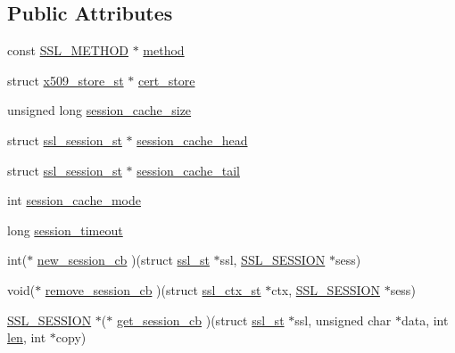 \subsection*{Public Attributes}
\begin{DoxyCompactItemize}
\item 
const \hyperlink{ssl_8h_a74d54b9a714accac31c73bfb55973e81}{S\+S\+L\+\_\+\+M\+E\+T\+H\+OD} $\ast$ \hyperlink{structssl__ctx__st_a9e4773d3ec5b1a80abab92390015c576}{method}
\item 
struct \hyperlink{structx509__store__st}{x509\+\_\+store\+\_\+st} $\ast$ \hyperlink{structssl__ctx__st_a8b6658b3bc3acb20908f2541056e3949}{cert\+\_\+store}
\item 
unsigned long \hyperlink{structssl__ctx__st_af715c6f8caa8c192423ad5abfa211e6e}{session\+\_\+cache\+\_\+size}
\item 
struct \hyperlink{structssl__session__st}{ssl\+\_\+session\+\_\+st} $\ast$ \hyperlink{structssl__ctx__st_a3683adb75792a407eee86f042a7c7c68}{session\+\_\+cache\+\_\+head}
\item 
struct \hyperlink{structssl__session__st}{ssl\+\_\+session\+\_\+st} $\ast$ \hyperlink{structssl__ctx__st_a1524f4319d24d011a575b8e9a70a0065}{session\+\_\+cache\+\_\+tail}
\item 
int \hyperlink{structssl__ctx__st_a957af083f0d87b4347e29788bd7e00e5}{session\+\_\+cache\+\_\+mode}
\item 
long \hyperlink{structssl__ctx__st_a7b165f0e9fbde0499dedb660cdf0d756}{session\+\_\+timeout}
\item 
int($\ast$ \hyperlink{structssl__ctx__st_a114da734a32555bec7ac1543e7fcef11}{new\+\_\+session\+\_\+cb} )(struct \hyperlink{structssl__st}{ssl\+\_\+st} $\ast$ssl, \hyperlink{ssl_8h_a8dd6b81bbcb1b2d769235c37779d2a94}{S\+S\+L\+\_\+\+S\+E\+S\+S\+I\+ON} $\ast$sess)
\item 
void($\ast$ \hyperlink{structssl__ctx__st_a52d5ac51adc42ec8253a089cbc25afcc}{remove\+\_\+session\+\_\+cb} )(struct \hyperlink{structssl__ctx__st}{ssl\+\_\+ctx\+\_\+st} $\ast$ctx, \hyperlink{ssl_8h_a8dd6b81bbcb1b2d769235c37779d2a94}{S\+S\+L\+\_\+\+S\+E\+S\+S\+I\+ON} $\ast$sess)
\item 
\hyperlink{ssl_8h_a8dd6b81bbcb1b2d769235c37779d2a94}{S\+S\+L\+\_\+\+S\+E\+S\+S\+I\+ON} $\ast$($\ast$ \hyperlink{structssl__ctx__st_ac177321ecedb6c1adc3b8abb703607c2}{get\+\_\+session\+\_\+cb} )(struct \hyperlink{structssl__st}{ssl\+\_\+st} $\ast$ssl, unsigned char $\ast$data, int \hyperlink{x509_8h_ad8c3db4434e9cb5cd772cc009f40e856}{len}, int $\ast$copy)
\item 

\end{DoxyCompactItemize}
